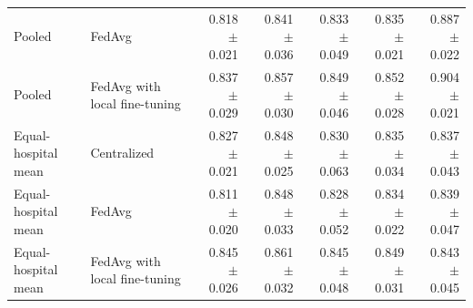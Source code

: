 \begin{table}[ht]
\begin{tabular}{llrrrrr}
Pooled & FedAvg & 0.818 $\pm$ 0.021 & 0.841 $\pm$ 0.036 & 0.833 $\pm$ 0.049 & 0.835 $\pm$ 0.021 & 0.887 $\pm$ 0.022 \\
Pooled & FedAvg with local fine-tuning & 0.837 $\pm$ 0.029 & 0.857 $\pm$ 0.030 & 0.849 $\pm$ 0.046 & 0.852 $\pm$ 0.028 & 0.904 $\pm$ 0.021 \\
Equal-hospital mean & Centralized & 0.827 $\pm$ 0.021 & 0.848 $\pm$ 0.025 & 0.830 $\pm$ 0.063 & 0.835 $\pm$ 0.034 & 0.837 $\pm$ 0.043 \\
Equal-hospital mean & FedAvg & 0.811 $\pm$ 0.020 & 0.848 $\pm$ 0.033 & 0.828 $\pm$ 0.052 & 0.834 $\pm$ 0.022 & 0.839 $\pm$ 0.047 \\
Equal-hospital mean & FedAvg with local fine-tuning & 0.845 $\pm$ 0.026 & 0.861 $\pm$ 0.032 & 0.845 $\pm$ 0.048 & 0.849 $\pm$ 0.031 & 0.843 $\pm$ 0.045 \\
\bottomrule
\end{tabular}
\end{table}
